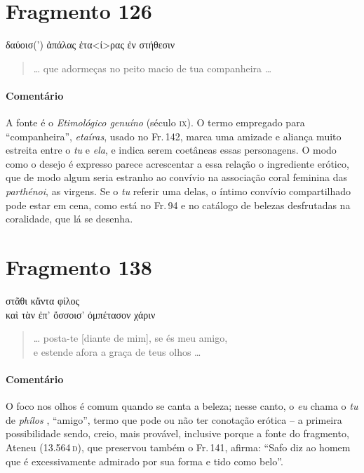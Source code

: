\section{Fragmento 126}

\begin{gkverse}
δαύοισ(’) ἀπάλας ἐτα<ί>ρας ἐν στήθεσιν
\end{gkverse}

\begin{verse}
\ldots{} que adormeças no peito macio de tua companheira \ldots{} 
\end{verse}

\medskip

{\paragraph{Comentário} A fonte é o \textit{Etimológico genuíno }(século \textsc{ix}). O termo empregado para
``companheira'', \textit{etaíras}, usado no Fr.\,142, marca uma amizade e aliança muito estreita entre o \textit{tu}
e \textit{ela}, e indica serem coetâneas essas personagens. O modo como o desejo é expresso parece acrescentar a essa relação o
ingrediente erótico, que de modo algum seria estranho ao convívio na associação coral feminina das \textit{parthénoi}, as virgens. Se o \textit{tu} referir uma delas, o íntimo convívio compartilhado pode estar em cena, como está no Fr.\,94 e no catálogo de belezas desfrutadas na coralidade, que lá se desenha.}




\pagebreak
\section{Fragmento 138}

\begin{gkverse}
στᾶθι \dagger{}κἄντα\dagger{} φίλος\\
καὶ τὰν ἐπ’ ὄσσοισ’ ὀμπέτασον χάριν
\end{gkverse}

\begin{verse}
\ldots{} posta-te [diante de mim], se és meu amigo,\\
e estende afora a graça de teus olhos \ldots{}
\end{verse}

\medskip

{\paragraph{Comentário} O foco nos olhos é comum quando se canta a beleza; nesse canto, o \textit{eu} chama o
\textit{tu} de \textit{phílos }, ``amigo'', termo que pode ou não ter conotação
erótica -- a primeira possibilidade sendo, creio, mais provável, inclusive
porque a fonte do fragmento, Ateneu (13.564\,\textsc{d}), que preservou também o Fr.\,141, afirma:
``Safo diz ao homem que é excessivamente admirado por sua forma e tido como belo''.}



